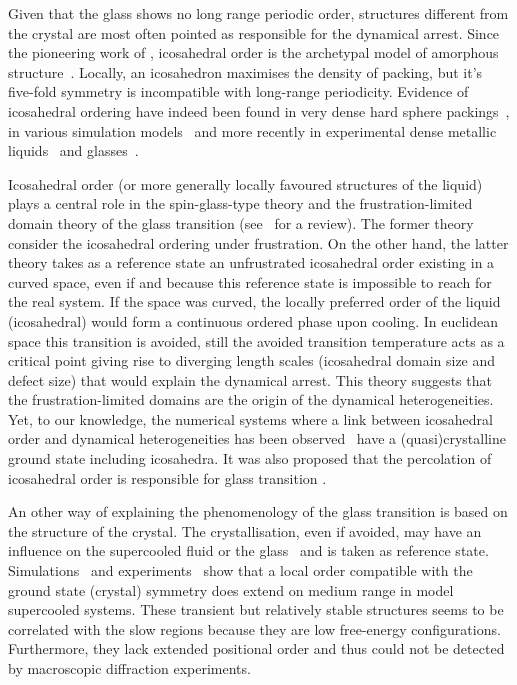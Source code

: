 Given that the glass shows no long range periodic order, structures different from the crystal are most often pointed as responsible for the dynamical arrest. Since the pioneering work of \citet{Frank1952}, icosahedral order is the archetypal model of amorphous structure~\citep{Spaepen2000}. Locally, an icosahedron maximises the density of packing, but it's five-fold symmetry is incompatible with long-range periodicity. Evidence of icosahedral ordering have indeed been found in very dense hard sphere packings~\citep{Bernal1960, Clarke1993, Malshe2011}, in various simulation models~\citep{steinhardt1983boo, Tomida1995, Doye2003, Coslovich2007, Pedersen2010, Coslovich2011} and more recently in experimental dense metallic liquids~\citep{Reichert2000, Celino2007} and glasses~\citep{Luo2004, Wang2011}.

Icosahedral order (or more generally locally favoured structures of the liquid) plays a central role in the spin-glass-type theory \cite{steinhardt1983boo} and the frustration-limited domain theory of the glass transition (see~\citep{tarjus2005fba} for a review). The former theory consider the icosahedral ordering under frustration. On the other hand, the latter theory takes as a reference state an unfrustrated icosahedral order existing in a curved space, even if and because this reference state is impossible to reach for the real system. If the space was curved, the locally preferred order of the liquid (icosahedral) would form a continuous ordered phase upon cooling. In euclidean space this transition is avoided, still the avoided transition temperature acts as a critical point giving rise to diverging length scales (icosahedral domain size and defect size) that would explain the dynamical arrest. This theory suggests that the frustration-limited domains are the origin of the dynamical heterogeneities. Yet, to our knowledge, the numerical systems where a link between icosahedral order and dynamical heterogeneities has been observed~\citep{Dzugutov2002, Doye2003, Coslovich2007, Pedersen2010, Coslovich2011} have a (quasi)crystalline ground state including icosahedra. It was also proposed that the percolation of icosahedral order is responsible for glass transition \cite{Tomida1995}.  

An other way of explaining the phenomenology of the glass transition is based on the structure of the crystal. The crystallisation, even if avoided, may have an influence on the supercooled fluid or the glass~\citep{tanaka1999top, Cavagna2003} and is taken as reference state. Simulations~\cite{kawasaki2007cbd, Kawasaki2010, Pedersen2010, Coslovich2011} and experiments~\citep{watanabe2008} show that a local order compatible with the ground state (crystal) symmetry does extend on medium range in model supercooled systems. These transient but relatively stable structures seems to be correlated with the slow regions because they are low free-energy configurations. Furthermore, they lack extended positional order and thus could not be detected by macroscopic diffraction experiments.

